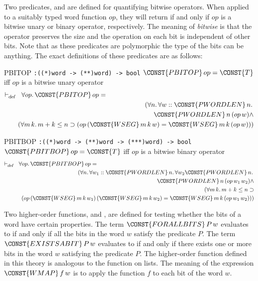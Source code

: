 Two predicates,  and  are defined for
quantifying bitwise operators.
When applied to a suitably typed word function $op$, they will return
 if and only if $op$ is a bitwise unary or binary operator,
respectively. The meaning of {\it bitwise\/} is that the operator
preserves the size and the operation on each bit is independent of
other bits. Note that as these predicates are polymorphic
the type of the bits can be anything. The exact definitions of these
predicates are as follows:  
\begin{constants}
\item[PBITOP]\verb":((*)word -> (**)word) -> bool" \newline
        $\CONST{PBITOP} \,op = \CONST{T}$ iff $op$ is a bitwise unary operator
\begin{eqnarray*}
\lefteqn{\DEF \FORALL op\DOT \CONST{PBITOP} \,op =} \\
 & & {} (\FORALL n\DOT \FORALL w :: \CONST{PWORDLEN} \,n\DOT \\
 & & \quad \CONST{PWORDLEN} \,n \,(op \,w) \AND \\
 & & \quad (\FORALL m \,k\DOT m + k \LEE  n \IMP  
           (op \,(\CONST{WSEG} \,m \,k \,w) = \CONST{WSEG} \,m \,k \,(op \,w)))
\end{eqnarray*}
\item[PBITBOP]\verb":((*)word -> (**)word -> (***)word) -> bool" \newline
        $\CONST{PBITBOP} \,op = \CONST{T}$ iff $op$ is a bitwise binary operator
\begin{eqnarray*}
\lefteqn{\DEF \FORALL op\DOT \CONST{PBITBOP} \,op =} \\
 & & {} (\FORALL n\DOT \FORALL w_1 :: \CONST{PWORDLEN} \,n\DOT
         \FORALL w_2 \CONST{PWORDLEN} \,n\DOT \\
 & & \quad \CONST{PWORDLEN} \,n \,(op \,w_{1} \,w_{2}) \AND \\
 & & \quad (\FORALL m \,k\DOT m + k \LEE  n \IMP \\
 & & \qquad (op \,(\CONST{WSEG} \,m \,k \,w_{1}) \,(\CONST{WSEG} \,m \,k \,w_{2}) =
        \CONST{WSEG} \,m \,k \,(op \,w_{1} \,w_{2})))
\end{eqnarray*}
\end{constants}

Two higher-order functions,  and ,
are defined for testing whether the bits of a word have certain
properties. The term $\CONST{FORALLBITS}\, P\,w$ evaluates to
 if and only if all the bits in the word $w$ satisfy the
predicate $P$. The term $\CONST{EXISTSABIT}\, P\,w$ evaluates to
 if and only if there exists one or more bits in the word $w$
satisfying the
predicate $P$. The higher-order function  defined in
this theory is analogous to the function  on lists. The
meaning of the expression $\CONST{WMAP}\, f\,w$ is to apply the
function $f$ to each bit of the word $w$.

